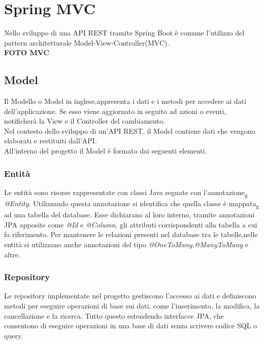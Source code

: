 \section{Spring MVC}
Nello sviluppo di una API REST tramite Spring Boot è comune l'utilizzo del pattern architetturale Model-View-Controller(MVC).\\

\textbf{FOTO MVC}\\

\subsection{Model}
Il Modello o Model in inglese,appresenta i dati e i metodi per accedere ai dati dell'applicazione. Se esso viene aggiornato in seguito ad azioni o eventi, notificherà la View e il Controller del cambiamento.\\
Nel contesto dello sviluppo di un'API REST, il Model contiene dati che vengono elaborati e restituiti dall'API.\\
All'interno del progetto il Model è formato dai seguenti elementi.
\subsubsection{Entità}
Le entità sono risorse rappresentate con classi Java segnate con l'annotazione\textsubscript{g} \textit{@Entity}. Utilizzando questa annotazione si identifica che quella classe è mappata\textsubscript{g} ad una tabella del database. Esse dichiarano al loro interno, tramite annotazioni JPA apposite come \textit{@Id} e \textit{@Column}, gli attributi corrispondenti alla tabella a cui fa riferimento. Per mantenere le relazioni presenti nel database tra le tabelle,nelle entità si utilizzano anche annotazioni del tipo \textit{@OneToMany},\textit{@ManyToMany} e altre.
\subsubsection{Repository}
Le repository implementate nel progetto gestiscono l'accesso ai dati e definiscono metodi per eseguire operazioni di base sui dati, come l'inserimento, la modifica, la cancellazione e la ricerca. Tutto questo estendendo interfacce JPA, che consentono di eseguire operazioni in una base di dati senza scrivere codice SQL o query.
